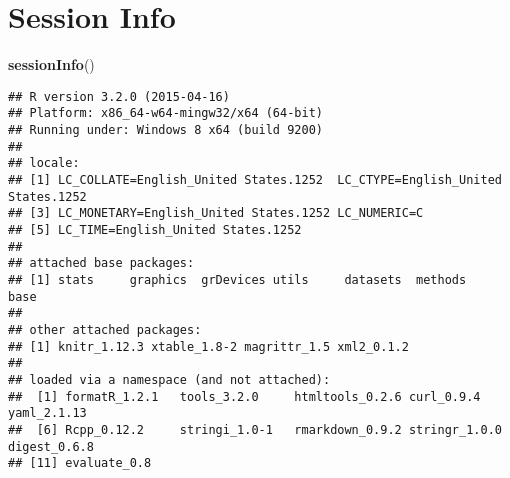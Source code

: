 \documentclass[]{article}
\newenvironment{Shaded}{\begin{snugshade}}{\end{snugshade}}
\newcommand{\KeywordTok}[1]{\textcolor[rgb]{0.13,0.29,0.53}{\textbf{{#1}}}}
\newcommand{\NormalTok}[1]{{#1}}
\begin{document}
\clearpage

\section{Session Info}\label{session-info}

\begin{Shaded}
\begin{Highlighting}[]
\KeywordTok{sessionInfo}\NormalTok{()}
\end{Highlighting}
\end{Shaded}

\begin{verbatim}
## R version 3.2.0 (2015-04-16)
## Platform: x86_64-w64-mingw32/x64 (64-bit)
## Running under: Windows 8 x64 (build 9200)
## 
## locale:
## [1] LC_COLLATE=English_United States.1252  LC_CTYPE=English_United States.1252   
## [3] LC_MONETARY=English_United States.1252 LC_NUMERIC=C                          
## [5] LC_TIME=English_United States.1252    
## 
## attached base packages:
## [1] stats     graphics  grDevices utils     datasets  methods   base     
## 
## other attached packages:
## [1] knitr_1.12.3 xtable_1.8-2 magrittr_1.5 xml2_0.1.2  
## 
## loaded via a namespace (and not attached):
##  [1] formatR_1.2.1   tools_3.2.0     htmltools_0.2.6 curl_0.9.4      yaml_2.1.13    
##  [6] Rcpp_0.12.2     stringi_1.0-1   rmarkdown_0.9.2 stringr_1.0.0   digest_0.6.8   
## [11] evaluate_0.8
\end{verbatim}
\end{document}
